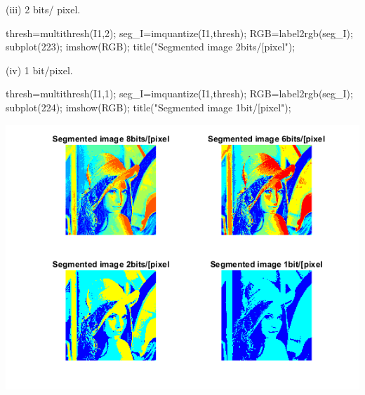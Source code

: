 \documentclass[12pt, onecolumn]{IEEEtran}
\begin{document}
\begin{par}
\begin{flushleft}
(iii) 2 bits/ pixel.
\end{flushleft}
\end{par}

\begin{matlabcode}
thresh=multithresh(I1,2); %
seg_I=imquantize(I1,thresh); %
RGB=label2rgb(seg_I); %
subplot(223); imshow(RGB); title("Segmented image 2bits/[pixel");
\end{matlabcode}

\begin{par}
\begin{flushleft}
(iv) 1 bit/pixel. 
\end{flushleft}
\end{par}

\begin{matlabcode}
thresh=multithresh(I1,1); %
seg_I=imquantize(I1,thresh); %
RGB=label2rgb(seg_I); %
subplot(224); imshow(RGB); title("Segmented image 1bit/[pixel");
\end{matlabcode}
\begin{center}
\includegraphics[width=\maxwidth{56.196688409433015em}]{figure_6.png}
\end{center}

\end{document}

